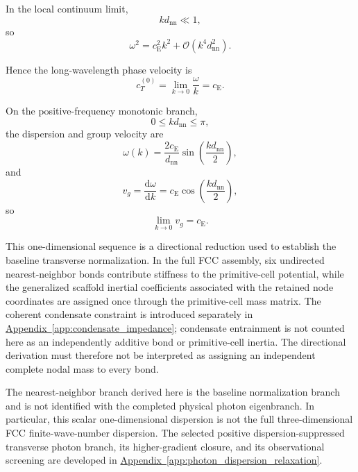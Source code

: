 In the local continuum limit,
\begin{equation}
    kd_{\mathrm{nn}} \ll 1,
\end{equation}
so
\begin{equation}
    \omega^2 = c_{\mathrm{E}}^2k^2 + \mathcal{O} \left( k^4d_{\mathrm{nn}}^2 \right).
\end{equation}

Hence the long-wavelength phase velocity is
\begin{equation}
    c_T^{(0)} = \lim_{k\rightarrow0} \frac{\omega}{k} = c_{\mathrm{E}}.
\end{equation}

On the positive-frequency monotonic branch,
\begin{equation}
    0 \leq kd_{\mathrm{nn}} \leq \pi,
\end{equation}
the dispersion and group velocity are
\begin{equation}
    \omega(k) = \frac{2c_{\mathrm{E}}}{d_{\mathrm{nn}}} \sin \left( \frac{kd_{\mathrm{nn}}}{2} \right),
\end{equation}
and
\begin{equation}
    v_g = \frac{\mathrm{d}\omega}{\mathrm{d}k} = c_{\mathrm{E}} \cos \left( \frac{kd_{\mathrm{nn}}}{2} \right),
\end{equation}
so
\begin{equation}
    \lim_{k\rightarrow0} v_g = c_{\mathrm{E}}.
\end{equation}

This one-dimensional sequence is a directional reduction used to establish the baseline transverse normalization. In the full FCC assembly, six undirected nearest-neighbor bonds contribute stiffness to the primitive-cell potential, while the generalized scaffold inertial coefficients associated with the retained node coordinates are assigned once through the primitive-cell mass matrix. The coherent condensate constraint is introduced separately in \hyperref[app:condensate_impedance]{Appendix~\ref*{app:condensate_impedance}}; condensate entrainment is not counted here as an independently additive bond or primitive-cell inertia. The directional derivation must therefore not be interpreted as assigning an independent complete nodal mass to every bond.

The nearest-neighbor branch derived here is the baseline normalization branch and is not identified with the completed physical photon eigenbranch. In particular, this scalar one-dimensional dispersion is not the full three-dimensional FCC finite-wave-number dispersion. The selected positive dispersion-suppressed transverse photon branch, its higher-gradient closure, and its observational screening are developed in \hyperref[app:photon_dispersion_relaxation]{Appendix~\ref*{app:photon_dispersion_relaxation}}.


